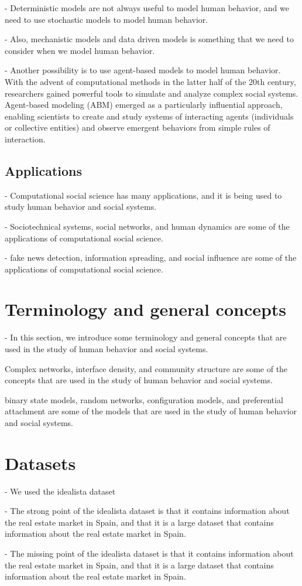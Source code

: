 - Deterministic models are not always useful to model human behavior, and we need to use stochastic models to model human behavior.

- Also, mechanistic models and data driven models is something that we need to consider when we model human behavior.

- Another possibility is to use agent-based models to model human behavior.
With the advent of computational methods in the latter half of the 20th century, researchers gained powerful tools to simulate and analyze complex social systems. Agent-based modeling (ABM) emerged as a particularly influential approach, enabling scientists to create and study systems of interacting agents (individuals or collective entities) and observe emergent behaviors from simple rules of interaction. 

\subsection{\label{subsec:Applications} Applications}

- Computational social science has many applications, and it is being used to study human behavior and social systems.

- Sociotechnical systems, social networks, and human dynamics are some of the applications of computational social science.

- fake news detection, information spreading, and social influence are some of the applications of computational social science.

\section{\label{sec:Terminology and general concepts} Terminology and general concepts}

- In this section, we introduce some terminology and general concepts that are used in the study of human behavior and social systems.

Complex networks, interface density, and community structure are some of the concepts that are used in the study of human behavior and social systems.

binary state models, random networks, configuration models, and preferential attachment are some of the models that are used in the study of human behavior and social systems.

\section{\label{sec:Datasets} Datasets}

- We used the idealista dataset

- The strong point of the idealista dataset is that it contains information about the real estate market in Spain, and that it is a large dataset that contains information about the real estate market in Spain.

- The missing point of the idealista dataset is that it contains information about the real estate market in Spain, and that it is a large dataset that contains information about the real estate market in Spain.
